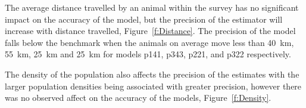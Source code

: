 \documentclass[a4paper,10pt,reqno,oneside]{amsart}
\begin{document}
The average distance travelled by an animal within the survey has no significant impact on the accuracy of the model, but the precision of the estimator will increase with distance travelled, Figure~\ref{f:Distance}. The precision of the model falls below the benchmark when the animals on average move less than \SI{40}{\kilo\meter}, \SI{55}{\kilo\meter}, \SI{25}{\kilo\meter} and \SI{25}{\kilo\meter} for models p141, p343, p221, and p322 respectively. 


The density of the population also affects the precision of the estimates with the larger population densities being associated with greater precision, however there was no observed affect on the accuracy of the models, Figure~\ref{f:Density}. 
\end{document}
